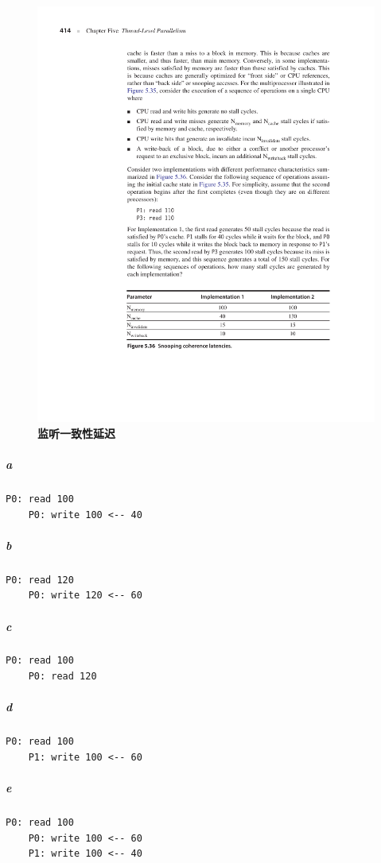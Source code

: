 \documentclass{article}
\begin{document}
\begin{figure}[h]
    \centering\caption{\textbf{监听一致性延迟}}
    \label{5-12}
    \includegraphics[scale = 1]{Figure/5-12.pdf}
\end{figure}
\subparagraph{a}
\begin{lstlisting}[]
    P0: read 100
    P0: write 100 <-- 40
\end{lstlisting}
\subparagraph{b}
\begin{lstlisting}[]
    P0: read 120
    P0: write 120 <-- 60
\end{lstlisting}
\subparagraph{c}
\begin{lstlisting}[]
    P0: read 100
    P0: read 120
\end{lstlisting}
\subparagraph{d}
\begin{lstlisting}[]
    P0: read 100
    P1: write 100 <-- 60
\end{lstlisting}
\subparagraph{e}
\begin{lstlisting}[]
    P0: read 100
    P0: write 100 <-- 60
    P1: write 100 <-- 40
\end{lstlisting}
\end{document}
